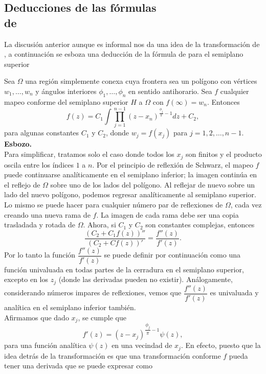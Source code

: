 \subsection{Deducciones de las fórmulas \\de \SC}
La discusión anterior aunque es informal nos da una idea de la transformación de \SC, a continuación se esboza una deducción de la fórmula de \SC \; para el semiplano superior
\begin{teor}
	Sea $\Omega$ una región simplemente conexa cuya frontera sea un polígono con vértices $w_1,\ldots,w_n$ y ángulos interiores $\phi_1, \ldots,\phi_n $ en sentido antihorario. Sea $f$ cualquier mapeo conforme del semiplano superior $H$ a $\Omega$ con $f (\infty) = w_n$. Entonces
	\begin{equation}\label{SCSP}
		f(z)=C_1\int \prod_{j=1}^{n-1}(z-x_n)^{\frac{\phi_j}{\pi}-1} dz +C_2,
	\end{equation}
	para algunas constantes $C_1$ y $C_2$, donde $w_j=f(x_j)$ para $j=1,2,\ldots,n-1$. \\
	\textbf{Esbozo.}\\Para simplificar, tratamos solo el caso donde todos los $x_j$ son finitos y el producto oscila entre los índices $1$ a $n$. Por el principio de reflexión de Schwarz,  el mapeo $f$ puede continuarse analíticamente en el semiplano inferior; la imagen continúa en el reflejo de $\Omega$ sobre uno de los lados del polígono. Al reflejar de nuevo sobre un lado del nuevo polígono, podemos regresar analíticamente al semiplano superior. Lo mismo se puede hacer para cualquier número par de reflexiones de $\Omega$, cada vez creando una nueva rama de $f$. La imagen de cada rama debe ser una copia trasladada y rotada de $\Omega$. Ahora, si $C_1$ y $C_2$ son constantes complejas, entonces
	$$\dfrac{(C_2+C_1f(z))''}{(C_2+Cf(z))'}=\dfrac{f''(z)}{f'(z)}.$$
	Por lo tanto la función $\dfrac{f''(z)}{f'(z)}$ se puede definir por  continuación como una función univaluada en todas partes de la cerradura en el semiplano superior, excepto en los $z_j$ (donde las derivadas pueden no existir). Análogamente, considerando números impares de reflexiones, vemos que $\dfrac{f''(z)}{f'(z)}$ 	es univaluada y analítica en el semiplano inferior también.\\
	Afirmamos que dado $x_j$, se cumple que 
	$$f'(z)=(z-x_j)^{\dfrac{\phi_j}{\pi}-1}\psi(z),$$
	para una función analítica $\psi(z)$ en una vecindad de $x_j$. En efecto, puesto 	que la idea detrás de la transformación \SC \; es que una transformación conforme $f$ pueda tener una derivada que se puede expresar 	como

\end{teor}
